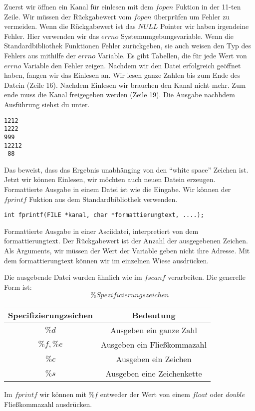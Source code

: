 \documentclass{article}[12pt]
\newenvironment{myexampleblock}[1]{%
    \tcolorbox[beamer,%
    noparskip,breakable,
    colback=White,colframe=ForestGreen,%
    colbacklower=LimeGreen!75!White,%
    title=#1]}%
    {\endtcolorbox}
\begin{document}
Zuerst wir öffnen ein Kanal für einlesen mit dem $fopen$ Fuktion in der 11-ten Zeile. Wir müssen 
der Rückgabewert vom $fopen$ überprüfen um Fehler zu vermeiden. Wenn die Rückgabewert ist das 
$NULL$ Pointer wir haben irgendeine Fehler. Hier verwenden wir das $errno$ Systemumgebungsvariable.
Wenn die Standardbibliothek Funktionen Fehler zurückgeben, sie auch weisen den Typ des Fehlers aus mithilfe
der $errno$ Variable. Es gibt Tabellen, die für jede Wert von $errno$ Variable den Fehler zeigen.
Nachdem wir den Datei erfolgreich geöffnet haben, fangen wir das Einlesen an. Wir lesen 
ganze Zahlen bis zum Ende des Datein (Zeile 16). Nachdem Einlesen wir brauchen den Kanal nicht mehr. 
Zum ende muss die Kanal freigegeben werden (Zeile 19). Die Ausgabe nachhdem Ausführung siehst du unter.
\begin{lstlisting}
1212
1222
999
12212
 88
\end{lstlisting}
Das beweist, dass das Ergebnis unabhänging von den ``white space'' Zeichen ist. Jetzt wir können Einlesen, 
wir möchten auch neuen Datein erzeugen. Formattierte Ausgabe in einem Datei ist wie die Eingabe. Wir können 
der $fprintf$ Fuktion aus dem Standardbibliothek verwenden.
\begin{myexampleblock}{Funktion: \texttt{fprintf}}
\begin{lstlisting}
int fprintf(FILE *kanal, char *formattierungtext, ....);
\end{lstlisting}
Formattierte Ausgabe in einer Asciidatei, interpretiert von dem formattierungtext. Der Rückgabewert ist der
Anzahl der ausgegebenen Zeichen. Als Arguments, wir müssen der Wert der Variable geben
nicht ihre Adresse. Mit dem formattierungtext können wir im einzelnen Wiese ausdrücken.

Die ausgebende Datei wurden ähnlich wie im $fscanf$ verarbeiten. Die generelle Form ist:
$$\%Spezificierungszeichen$$
{
\begin{center}
\begin{tabular}{|cc|}
\hline
Specifizierungzeichen & Bedeutung \\\hline
$\%d$   &  Ausgeben ein ganze Zahl \\
$\%f,\%e$   & Ausgeben ein Fließkommazahl  \\
$\%c$  & Ausgeben ein Zeichen  \\
$\%s$  & Ausgeben eine Zeichenkette\\
\hline
\end{tabular}
\end{center}
}
Im $fprintf$ wir können mit $\%f$ entweder der Wert von einem $float$ oder $double$ Fließkommazahl
ausdrücken.
\end{myexampleblock}
\end{document}
